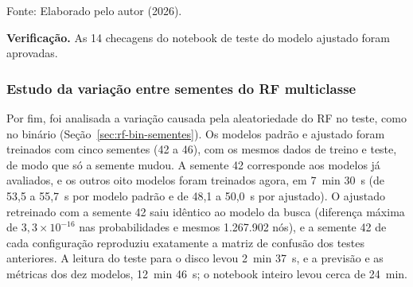 \documentclass[
    12pt,                %
    openright,           %
    oneside,             %
    a4paper,             %
    english,             %
    brazil               %
]{abntex2}
\begin{document}
\begin{table}
\centering
\caption{Custo de treino e tamanho dos modelos RF multiclasse (sem os picos de memória do processo)}
\label{tab:rf-multi-custo-treino-tamanho}
\footnotesize
{}
\par\smallskip
Fonte: Elaborado pelo autor (2026).
\end{table}
 
\textbf{Verificação.} As 14 checagens do notebook de teste do modelo ajustado foram aprovadas.
 
 
\subsubsection{Estudo da variação entre sementes do RF multiclasse}
\label{sec:rf-multi-sementes}
 
Por fim, foi analisada a variação causada pela aleatoriedade do RF no teste, como no binário (Seção~\ref{sec:rf-bin-sementes}). Os modelos padrão e ajustado foram treinados com cinco sementes (42 a 46), com os mesmos dados de treino e teste, de modo que só a semente mudou. A semente 42 corresponde aos modelos já avaliados, e os outros oito modelos foram treinados agora, em 7~min 30~s (de 53,5 a 55,7~s por modelo padrão e de 48,1 a 50,0~s por ajustado). O ajustado retreinado com a semente 42 saiu idêntico ao modelo da busca (diferença máxima de $3{,}3\times10^{-16}$ nas probabilidades e mesmos 1.267.902 nós), e a semente 42 de cada configuração reproduziu exatamente a matriz de confusão dos testes anteriores. A leitura do teste para o disco levou 2~min 37~s, e a previsão e as métricas dos dez modelos, 12~min 46~s; o notebook inteiro levou cerca de 24~min.
 
\end{document}
